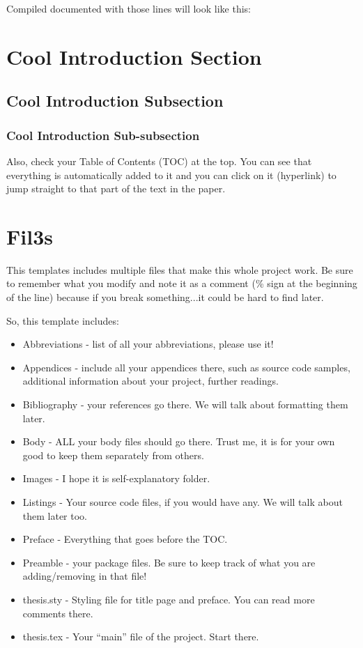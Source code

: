 Compiled documented with those lines will look like this:

\section{Cool Introduction Section}
\label{sec:cool_intro}

\subsection{Cool Introduction Subsection}
\label{sec:cool_intro_subsec}

\subsubsection{Cool Introduction Sub-subsection}
\label{sec:cool_intro_subsubsec}

Also, check your Table of Contents (TOC) at the top. You can see that everything is automatically added to it and you can click on it (hyperlink) to jump straight to that part of the text in the paper.

\section{Fil3s}
This templates includes multiple files that make this whole project work. Be sure to remember what you modify and note it as a comment (\% sign at the beginning of the line) because if you break something...it could be hard to find later.

So, this template includes:
\begin{itemize}
    \item Abbreviations - list of all your abbreviations, please use it!
    \item Appendices - include all your appendices there, such as source code samples, additional information about your project, further readings.
    \item Bibliography - your references go there. We will talk about formatting them later.
    \item Body - ALL your body files should go there. Trust me, it is for your own good to keep them separately from others.
    \item Images - I hope it is self-explanatory folder.
    \item Listings - Your source code files, if you would have any. We will talk about them later too.
    \item Preface - Everything that goes before the TOC.
    \item Preamble - your package files. Be sure to keep track of what you are adding/removing in that file!
    \item thesis.sty - Styling file for title page and preface. You can read more comments there.
    \item thesis.tex - Your ``main'' file of the project. Start there.
\end{itemize}

